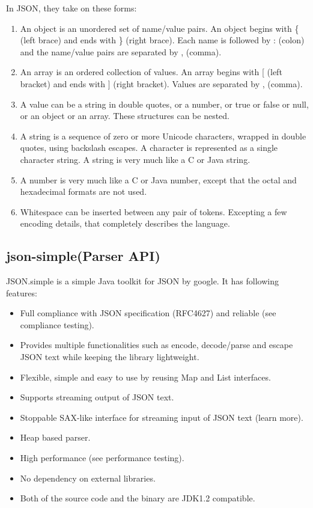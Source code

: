 In JSON, they take on these forms:
\begin{enumerate}
\item An object is an unordered set of name/value pairs. An object begins with \{ (left brace) and ends with \} (right brace). Each name is followed by : (colon) and the name/value pairs are separated by , (comma).
\item An array is an ordered collection of values. An array begins with [ (left bracket) and ends with ] (right bracket). Values are separated by , (comma).
\item A value can be a string in double quotes, or a number, or true or false or null, or an object or an array. These structures can be nested.
\item A string is a sequence of zero or more Unicode characters, wrapped in double quotes, using backslash escapes. A character is represented as a single character string. A string is very much like a C or Java string.
\item A number is very much like a C or Java number, except that the octal and hexadecimal formats are not used.
\item Whitespace can be inserted between any pair of tokens. Excepting a few encoding details, that completely describes the language.
\end{enumerate}

\subsection{json-simple(Parser API)}
JSON.simple\cite{JSON-simple} is a simple Java toolkit for JSON by google.
It has following features:
\begin{itemize}
\item Full compliance with JSON specification (RFC4627) and reliable (see compliance testing).
\item Provides multiple functionalities such as encode, decode/parse and escape JSON text while keeping the library lightweight.
\item Flexible, simple and easy to use by reusing Map and List interfaces.
\item Supports streaming output of JSON text.
\item Stoppable SAX-like interface for streaming input of JSON text (learn more).
\item Heap based parser.
\item High performance (see performance testing).
\item No dependency on external libraries.
\item Both of the source code and the binary are JDK1.2 compatible.
\end{itemize}

